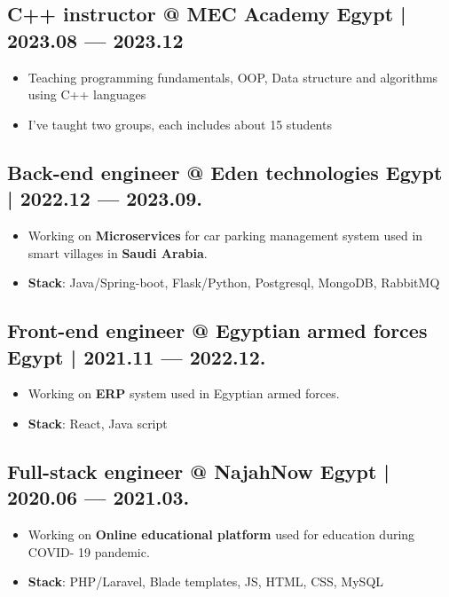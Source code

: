 \documentclass[a4,10pt]{article}
\newenvironment{zitemize}{
\begin{itemize}\itemsep0pt \parskip0pt \parsep1pt}
{\end{itemize}\vspace{-0.5cm}}
\begin{document}
\subsection*{C++ instructor @ MEC Academy \hfill Egypt | 2023.08 --- 2023.12} 
    \begin{zitemize}
        \item Teaching programming fundamentals, OOP, Data structure and algorithms
        using C++ languages
        \item I’ve taught two groups, each includes about 15 students
    \end{zitemize}

\subsection*{Back-end engineer @ Eden technologies \hfill Egypt | 2022.12 --- 2023.09.} 
    \begin{zitemize}
        \item Working on \textbf{Microservices} for car parking management system used in smart villages in
        \textbf{Saudi Arabia}.
        \item \textbf{Stack}: Java/Spring-boot, Flask/Python, Postgresql, MongoDB, RabbitMQ
    \end{zitemize}

\subsection*{Front-end engineer @ Egyptian armed forces \hfill Egypt | 2021.11 --- 2022.12.} 
    \begin{zitemize}
        \item Working on \textbf{ERP} system used in Egyptian armed forces.
        \item \textbf{Stack}: React, Java script
    \end{zitemize}

\subsection*{Full-stack engineer @ NajahNow \hfill Egypt | 2020.06 --- 2021.03.} 
    \begin{zitemize}
        \item Working on \textbf{Online educational platform} used for education during COVID-
        19 pandemic.
        \item \textbf{Stack}: PHP/Laravel, Blade templates, JS, HTML, CSS, MySQL
    \end{zitemize}
\end{document}
